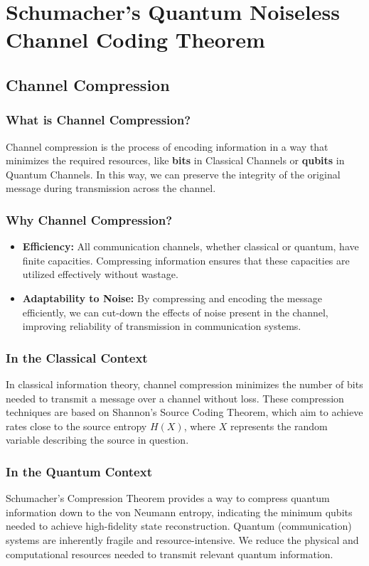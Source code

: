 \section{Schumacher's Quantum Noiseless Channel Coding Theorem}

\subsection{Channel Compression}

\subsubsection{What is Channel Compression?}
Channel compression is the process of encoding information in a way that minimizes the required resources, like \textbf{bits} in Classical Channels or \textbf{qubits} in Quantum Channels. In this way, we can preserve the integrity of the original message during transmission across the channel. 

\subsubsection{Why Channel Compression?}
\begin{itemize}
    \item \textbf{Efficiency:} All communication channels, whether classical or quantum, have finite capacities. Compressing information ensures that these capacities are utilized effectively without wastage.
    \item \textbf{Adaptability to Noise:} By compressing and encoding the message efficiently, we can cut-down the effects of noise present in the channel, improving reliability of transmission in communication systems. 
\end{itemize}

\subsubsection{In the Classical Context}
In classical information theory, channel compression minimizes the number of bits needed to transmit a message over a channel without loss. These compression techniques are based on Shannon's Source Coding Theorem, which aim to achieve rates close to the source entropy \(H(X)\), where \(X\) represents the random variable describing the source in question. 

\subsubsection{In the Quantum Context}
Schumacher’s Compression Theorem provides a way to compress quantum information down to the von Neumann entropy, indicating the minimum qubits needed to achieve high-fidelity state reconstruction. Quantum (communication) systems are inherently fragile and resource-intensive. We reduce the physical and computational resources needed to transmit relevant quantum information. 

